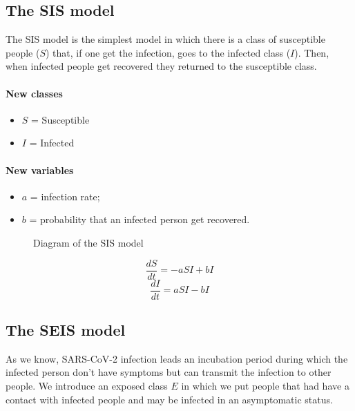 \documentclass[12pt]{llncs}
\begin{document}
\subsection{The SIS model}
The SIS model is the simplest model in which there is a class of susceptible people ($S$) that, if one get the infection, goes to the infected class ($I$). Then, when infected people get recovered they returned to the susceptible class.

\paragraph{New classes}
\begin{itemize}
\item $S$ = Susceptible
\item $I$ = Infected
\end{itemize}

\paragraph{New variables}
\begin{itemize}
\item $a$ = infection rate;
\item $b$ = probability that an infected person get recovered.
\end{itemize}

\begin{figure}[H]
	\centering
    \caption{Diagram of the SIS model}
\end{figure}

$$\frac{dS}{dt} = -aSI + bI$$
$$\frac{dI}{dt} = aSI - bI$$

\subsection{The SEIS model}
As we know, SARS-CoV-2 infection leads an incubation period during which the infected person don't have symptoms but can transmit the infection to other people. We introduce an exposed class $E$ in which we put people that had have a contact with infected people and may be infected in an asymptomatic status.
\end{document}
